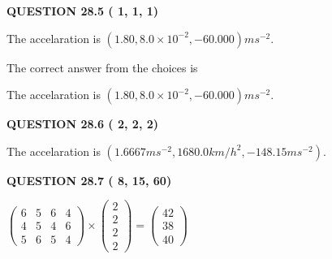 \documentclass[12pt]{article}
\begin{document}
  
 
 
 
 
  
\vspace{0.2in}
  
{\textbf{\Large{QUESTION
28.5 
 (          1,          1,          1)
}}}
  
  


 
 
\noindent{}
 
 
The accelaration is $  %
(
1.80,
8.0 \times 10^{-2},
-60.000)
ms^{-2} $.
 
 
 
 
 
 
\noindent{}

The correct answer from the choices is


The accelaration is $  %
(
1.80,
8.0 \times 10^{-2},
-60.000)
ms^{-2} $.
 
 
 
  
\vspace{0.2in}
  
{\textbf{\Large{QUESTION
28.6 
 (          2,          2,          2)
}}}
  
  
 
 
\noindent{}
 
 
The accelaration is
$(
1.6667ms^{-2},
1680.0km/h^2,
-148.15ms^{-2}
).
$
 
 
 
 
  
\vspace{0.2in}
  
{\textbf{\Large{QUESTION
28.7 
 (          8,         15,         60)
}}}
  
  
 
 
\noindent{}

 
$\left( \begin{array}{ccccccccccccccc}
           6 & 
           5 & 
           6 & 
           4 \\ 
           4 & 
           5 & 
           4 & 
           6 \\ 
           5 & 
           6 & 
           5 & 
           4
\end{array}\right) \times
\left( \begin{array}{c}
           2 \\ 
           2 \\ 
           2 \\ 
           2
\end{array}\right)  =
\left( \begin{array}{c}
          42 \\ 
          38 \\ 
          40
\end{array}\right)  $
 
\end{document}
